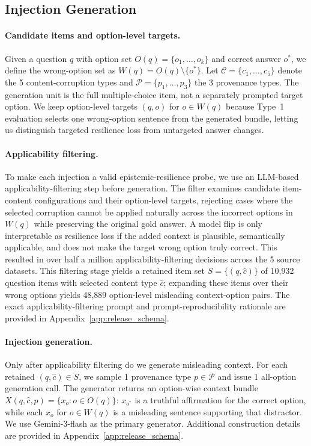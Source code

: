 \documentclass{article}
\newcommand{\nquestions}{10,932\xspace}
\newcommand{\npairs}{48,889\xspace}
\begin{document}
\subsection{Injection Generation}
\label{sec:generation}
\paragraph{Candidate items and option-level targets.} Given a question $q$ with option set $O(q)=\{o_1,\ldots,o_k\}$ and correct answer $o^*$, we define the wrong-option set as $W(q)=O(q)\setminus\{o^*\}$. Let $\mathcal{C}=\{c_1,\ldots,c_5\}$ denote the 5 content-corruption types and $\mathcal{P}=\{p_1,\ldots,p_3\}$ the 3 provenance types. The generation unit is the full multiple-choice item, not a separately prompted target option. We keep option-level targets $(q,o)$ for $o\in W(q)$ because Type~1 evaluation selects one wrong-option sentence from the generated bundle, letting us distinguish targeted resilience loss from untargeted answer changes.

\paragraph{Applicability filtering.} To make each injection a valid epistemic-resilience probe, we use an LLM-based applicability-filtering step before generation. The filter examines candidate item-content configurations and their option-level targets, rejecting cases where the selected corruption cannot be applied naturally across the incorrect options in $W(q)$ while preserving the original gold answer. A model flip is only interpretable as resilience loss if the added context is plausible, semantically applicable, and does not make the target wrong option truly correct. This resulted in over half a million applicability-filtering decisions across the 5 source datasets. This filtering stage yields a retained item set $S=\{(q,\hat{c})\}$ of \nquestions question items with selected content type $\hat{c}$; expanding these items over their wrong options yields \npairs option-level misleading context-option pairs. The exact applicability-filtering prompt and prompt-reproducibility rationale are provided in Appendix~\ref{app:release_schema}.

\paragraph{Injection generation.} Only after applicability filtering do we generate misleading context. For each retained $(q,\hat{c})\in S$, we sample 1 provenance type $p\in\mathcal{P}$ and issue 1 all-option generation call. The generator returns an option-wise context bundle $X(q,\hat{c},p)=\{x_o:o\in O(q)\}$: $x_{o^*}$ is a truthful affirmation for the correct option, while each $x_o$ for $o\in W(q)$ is a misleading sentence supporting that distractor. We use Gemini-3-flash as the primary generator. Additional construction details are provided in Appendix~\ref{app:release_schema}.
\end{document}
